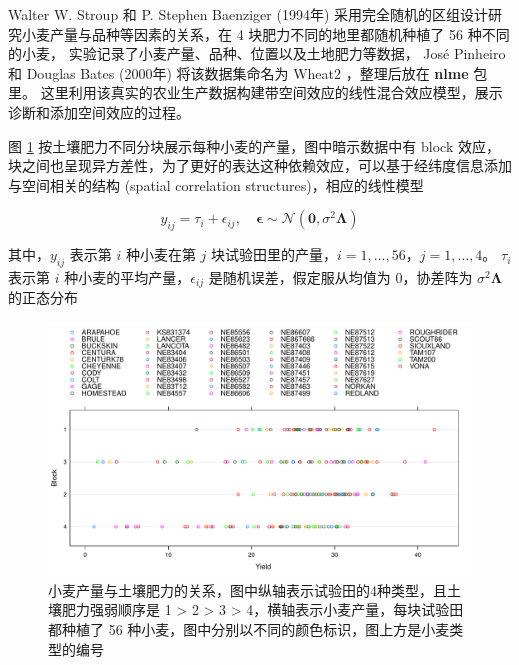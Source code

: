 \documentclass[12pt,a4paper,UTF8,twoside]{book}
\theoremstyle{definition}
\theoremstyle{definition}
\theoremstyle{definition}
\theoremstyle{remark}
\begin{document}
Walter W. Stroup 和 P. Stephen Baenziger (1994年) \citep{Stroup1994}
采用完全随机的区组设计研究小麦产量与品种等因素的关系，在 4
块肥力不同的地里都随机种植了 56 种不同的小麦，
实验记录了小麦产量、品种、位置以及土地肥力等数据， José Pinheiro 和
Douglas Bates (2000年) \citep{Pinheiro2000} 将该数据集命名为 Wheat2
，整理后放在 \textbf{nlme} 包里。
这里利用该真实的农业生产数据构建带空间效应的线性混合效应模型，展示诊断和添加空间效应的过程。

图 \ref{fig:yields-block}
按土壤肥力不同分块展示每种小麦的产量，图中暗示数据中有 block
效应，块之间也呈现异方差性，为了更好的表达这种依赖效应，可以基于经纬度信息添加与空间相关的结构
(spatial correlation structures)，相应的线性模型

\begin{equation}
y_{ij} = \tau_i + \epsilon_{ij}, \quad \boldsymbol{\epsilon} \sim \mathcal{N}(\mathbf{0},\sigma^2 \boldsymbol{\Lambda}) \label{eq:extended-linear-model}
\end{equation}

其中，\(y_{ij}\) 表示第 \(i\) 种小麦在第 \(j\)
块试验田里的产量，\(i = 1,\ldots,56\)，\(j = 1,\ldots,4\)。 \(\tau_i\)
表示第 \(i\) 种小麦的平均产量，\(\epsilon_{ij}\)
是随机误差，假定服从均值为 0，协差阵为 \(\sigma^2 \boldsymbol{\Lambda}\)
的正态分布

\begin{figure}

{\centering \includegraphics[width=0.9\linewidth]{figures/Yields-Block} 

}

\caption{小麦产量与土壤肥力的关系，图中纵轴表示试验田的4种类型，且土壤肥力强弱顺序是 1 > 2 > 3 > 4，横轴表示小麦产量，每块试验田都种植了 56 种小麦，图中分别以不同的颜色标识，图上方是小麦类型的编号}\label{fig:yields-block}
\end{figure}
\end{document}
